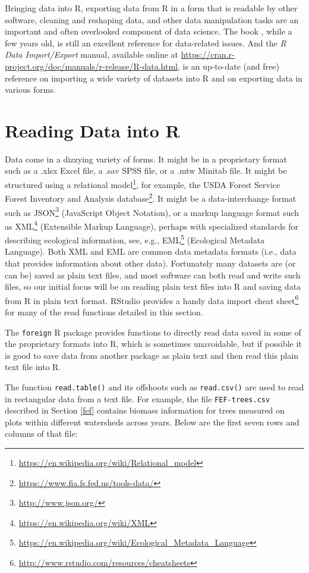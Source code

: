 \documentclass[]{krantz}
\renewcommand{\href}[2]{#2\footnote{\url{#1}}}
\theoremstyle{definition}
\theoremstyle{definition}
\theoremstyle{definition}
\theoremstyle{remark}
\begin{document}
Bringing data into R, exporting data from R in a form that is readable
by other software, cleaning and reshaping data, and other data
manipulation tasks are an important and often overlooked component of
data science. The book \citet{SpectorDataManipulation}, while a few
years old, is still an excellent reference for data-related issues. And
the \emph{R Data Import/Export} manual, available online at
\url{https://cran.r-project.org/doc/manuals/r-release/R-data.html}, is
an up-to-date (and free) reference on importing a wide variety of
datasets into R and on exporting data in various forms.

\section{Reading Data into R}\label{reading-data-into-r}

Data come in a dizzying variety of forms. It might be in a proprietary
format such as a .xlsx Excel file, a .sav SPSS file, or a .mtw Minitab
file. It might be structured using a
\href{https://en.wikipedia.org/wiki/Relational_model}{relational model},
for example, the USDA Forest Service
\href{https://www.fia.fs.fed.us/tools-data/}{Forest Inventory and
Analysis database}. It might be a data-interchange format such as
\href{http://www.json.org/}{JSON} (JavaScript Object Notation), or a
markup language format such as
\href{https://en.wikipedia.org/wiki/XML}{XML} (Extensible Markup
Language), perhaps with specialized standards for describing ecological
information, see, e.g.,
\href{https://en.wikipedia.org/wiki/Ecological_Metadata_Language}{EML}
(Ecological Metadata Language). Both XML and EML are common data
metadata formats (i.e., data that provides information about other
data). Fortunately many datasets are (or can be) saved as plain text
files, and most software can both read and write such files, so our
initial focus will be on reading plain text files into R and saving data
from R in plain text format. RStudio provides a handy
\href{http://www.rstudio.com/resources/cheatsheets}{data import cheat
sheet} for many of the read functions detailed in this section.

The \texttt{foreign} R package provides functions to directly read data
saved in some of the proprietary formats into R, which is sometimes
unavoidable, but if possible it is good to save data from another
package as plain text and then read this plain text file into R.

The function \texttt{read.table()} and its offshoots such as
\texttt{read.csv()} are used to read in rectangular data from a text
file. For example, the file \texttt{FEF-trees.csv} described in Section
\ref{fef} contains biomass information for trees measured on plots
within different watersheds across years. Below are the first seven rows
and columns of that file:
\end{document}
